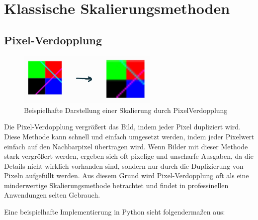 \usepackage{amsmath}
\usepackage{amssymb}
\chapter{Klassische Skalierungsmethoden}

    \section{Pixel-Verdopplung}

        \begin{figure}[h]
            \centering
            \includegraphics[width=0.6\textwidth]{img/so_sieht_pixel_verdopplung_aus.jpg}
            \caption{Beispielhafte Darstellung einer Skalierung durch PixelVerdopplung}
            \label{fig:beispielhafte_darstellung_einer_skalierung_durch_pixelverdopplung}
        \end{figure}

        Die Pixel-Verdopplung vergrößert das Bild, indem jeder Pixel dupliziert wird.
        Diese Methode kann schnell und einfach umgesetzt werden, indem jeder Pixelwert einfach auf den Nachbarpixel übertragen wird.
        Wenn Bilder mit dieser Methode stark vergrößert werden, ergeben sich oft pixelige und unscharfe Ausgaben, da die Details nicht wirklich vorhanden sind, sondern nur durch die Duplizierung von Pixeln aufgefüllt werden. 
        Aus diesem Grund wird Pixel-Verdopplung oft als eine minderwertige Skalierungsmethode betrachtet und findet in professinellen Anwendungen selten Gebrauch.~


    \newpage
    Eine beispielhafte Implementierung in Python sieht folgendermaßen aus:
    
